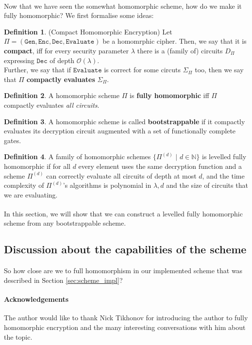 \documentclass{article}
\theoremstyle{definition}
\newtheorem{definition}{Definition}[section]
\theoremstyle{example}
\newcommand{\Enc}{\texttt{Enc}}
\newcommand{\Dec}{\texttt{Dec}}
\newcommand{\Gen}{\texttt{Gen}}
\newcommand{\Evaluate}{\texttt{Evaluate}}
\newcommand{\Oh}{\mathcal{O}}
\newcommand{\Nat}{\mathbb{N}}
\begin{document}
\paragraph{}
Now that we have seen the somewhat homomorphic scheme, how do we make it fully
homomorphic? We first formalise some ideas:
\begin{definition}{(Compact Homomorphic Encryption)}
  Let $\Pi = (\Gen, \Enc, \Dec, \Evaluate)$ be a homomrphic cipher. Then, we say that it is \textbf{compact},
  iff for every security parameter $\lambda$ there is a (family of) circuits $D_\Pi$
  expressing $\Dec$ of depth $\Oh(\lambda)$.\\
  Further, we say that if $\Evaluate$ is correct for some circuts $\Sigma_\Pi$ too,
  then we say that $\Pi$ \textbf{compactly evaluates} $\Sigma_\Pi$.
\end{definition}
\begin{definition}
  A homomorphic scheme $\Pi$ is \textbf{fully homomorphic} iff $\Pi$ compactly evaluates
  \textit{all circuits}.
\end{definition}
\begin{definition}
  A homomorphic scheme is called \textbf{bootstrappable} if it compactly
  evaluates its decryption circuit augmented with a set of functionally complete gates.
\end{definition}
\begin{definition}
  A family of homomorphic schemes $\{\Pi^{(d)}\,\,|\,\,d\in\Nat\}$ is levelled
  fully homomorphic if for all $d$ every element uses the same decryption
  function and a scheme $\Pi^{(d)}$ can correctly evaluate all circuits of depth
  at most $d$, and the time complexity of $\Pi^{(d)}$'s algorithms is
  polynomial in $\lambda, d$ and the size of circuits that we are evaluating.
\end{definition}
\paragraph{} In this section, we will show that we can construct a levelled
fully homomorphic scheme from any bootstrappable scheme.
\subsection{Discussion about the capabilities of the scheme}
\paragraph{} So how close are we to full homomorphism in our implemented scheme
that was described in Section \ref{sec:scheme_impl}?
\paragraph{Acknowledgements} The author would like to thank Nick Tikhonov for
introducing the author to fully homomorphic encryption and the many interesting
conversations with him about the topic.
\printbibliography
\end{document}
